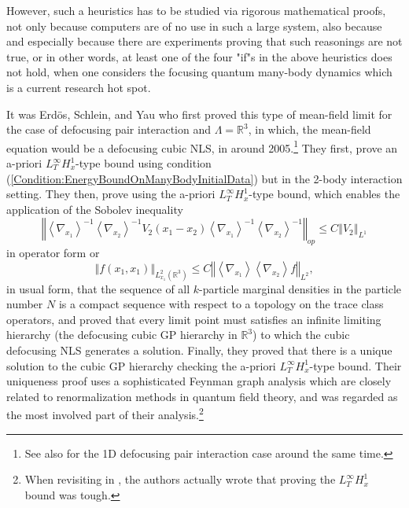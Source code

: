 \documentclass[12pt,letterpaper,leqno]{amsart}
\theoremstyle{plain}
\numberwithin{equation}{section}
\numberwithin{theorem}{section}
\numberwithin{proposition}{section}
\numberwithin{lemma}{section}
\numberwithin{corollary}{section}
\begin{document}
However, such a heuristics has to be studied via rigorous mathematical
proofs, not only because computers are of no use in such a large system,
also because and especially because there are experiments \cite%
{Cornish,JILA2} proving that such reasonings are not true, or in other
words, at least one of the four "if"s in the above heuristics does not hold,
when one considers the focusing quantum many-body dynamics which is a
current research hot spot.

It was Erd\"{o}s, Schlein, and Yau who first proved this type of mean-field
limit for the case of defocusing pair interaction and $\Lambda =\mathbb{R}%
^{3}$, in which, the mean-field equation would be a defocusing cubic NLS, in 
\cite{E-S-Y2,E-S-Y3,E-S-Y5} around 2005.\footnote{%
See also \cite{AGT} for the 1D defocusing pair interaction case around the
same time.} They first, prove an a-priori $L_{T}^{\infty }H_{x}^{1}$-type
bound using condition (\ref{Condition:EnergyBoundOnManyBodyInitialData}) but
in the 2-body interaction setting. They then, prove using the a-priori $%
L_{T}^{\infty }H_{x}^{1}$-type bound, which enables the application of the
Sobolev inequality%
\begin{equation}
\left\Vert \left\langle \nabla _{x_{1}}\right\rangle ^{-1}\left\langle
\nabla _{x_{2}}\right\rangle ^{-1}V_{2}(x_{1}-x_{2})\left\langle \nabla
_{x_{1}}\right\rangle ^{-1}\left\langle \nabla _{x_{2}}\right\rangle
^{-1}\right\Vert _{op}\leqslant C\left\Vert V_{2}\right\Vert _{L^{1}}
\label{estimate:OldESYSobolevInequality}
\end{equation}%
in operator form or 
\begin{equation*}
\left\Vert f(x_{1},x_{1})\right\Vert _{L_{x_{1}}^{2}(\mathbb{R}%
^{3})}\leqslant C\left\Vert \left\langle \nabla _{x_{1}}\right\rangle
\left\langle \nabla _{x_{2}}\right\rangle f\right\Vert _{L^{2}},
\end{equation*}%
in usual form, that the sequence of all $k$-particle marginal densities in
the particle number $N$ is a compact sequence with respect to a topology on
the trace class operators, and proved that every limit point must satisfies
an infinite limiting hierarchy (the defocusing cubic GP hierarchy in $%
\mathbb{R}^{3}$) to which the cubic defocusing NLS generates a solution.
Finally, they proved that there is a unique solution to the cubic GP
hierarchy checking the a-priori $L_{T}^{\infty }H_{x}^{1}$-type bound. Their
uniqueness proof uses a sophisticated Feynman graph analysis which are
closely related to renormalization methods in quantum field theory, and was
regarded as the most involved part of their analysis.\footnote{%
When revisiting \cite{E-S-Y2,E-S-Y3,E-S-Y5} in \cite{SchleinNew}, the
authors actually wrote that proving the $L_{T}^{\infty }H_{x}^{1}$ bound was
tough.}
\end{document}
